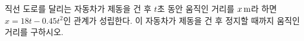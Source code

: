 직선 도로를 달리는 자동차가 제동을 건 후 $t$초 동안 움직인 거리를 $x\mkern3mu \mathrm{m}$라 하면 $x=18t-0.45t^2$인 관계가 성립한다. 이 자동차가 제동을 건 후 정지할 때까지 움직인 거리를 구하시오.
